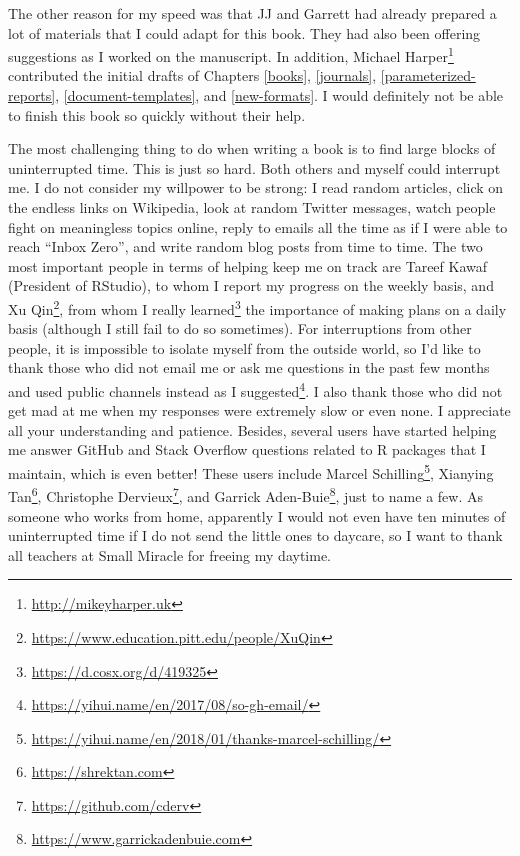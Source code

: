\documentclass[
  11pt,
]{krantz}
\renewcommand{\href}[2]{#2\footnote{\url{#1}}}
\theoremstyle{definition}
\theoremstyle{definition}
\theoremstyle{definition}
\theoremstyle{definition}
\theoremstyle{remark}
\begin{document}
The other reason for my speed was that JJ and Garrett had already prepared a lot of materials that I could adapt for this book. They had also been offering suggestions as I worked on the manuscript. In addition, \href{http://mikeyharper.uk}{Michael Harper} contributed the initial drafts of Chapters \ref{books}, \ref{journals}, \ref{parameterized-reports}, \ref{document-templates}, and \ref{new-formats}. I would definitely not be able to finish this book so quickly without their help.

The most challenging thing to do when writing a book is to find large blocks of uninterrupted time. This is just so hard. Both others and myself could interrupt me. I do not consider my willpower to be strong: I read random articles, click on the endless links on Wikipedia, look at random Twitter messages, watch people fight on meaningless topics online, reply to emails all the time as if I were able to reach ``Inbox Zero'', and write random blog posts from time to time. The two most important people in terms of helping keep me on track are Tareef Kawaf (President of RStudio), to whom I report my progress on the weekly basis, and \href{https://www.education.pitt.edu/people/XuQin}{Xu Qin}, from whom \href{https://d.cosx.org/d/419325}{I really learned} the importance of making plans on a daily basis (although I still fail to do so sometimes). For interruptions from other people, it is impossible to isolate myself from the outside world, so I'd like to thank those who did not email me or ask me questions in the past few months and used public channels instead \href{https://yihui.name/en/2017/08/so-gh-email/}{as I suggested}. I also thank those who did not get mad at me when my responses were extremely slow or even none. I appreciate all your understanding and patience. Besides, several users have started helping me answer GitHub and Stack Overflow questions related to R packages that I maintain, which is even better! These users include \href{https://yihui.name/en/2018/01/thanks-marcel-schilling/}{Marcel Schilling}, \href{https://shrektan.com}{Xianying Tan}, \href{https://github.com/cderv}{Christophe Dervieux}, and \href{https://www.garrickadenbuie.com}{Garrick Aden-Buie}, just to name a few. As someone who works from home, apparently I would not even have ten minutes of uninterrupted time if I do not send the little ones to daycare, so I want to thank all teachers at Small Miracle for freeing my daytime.
\end{document}
